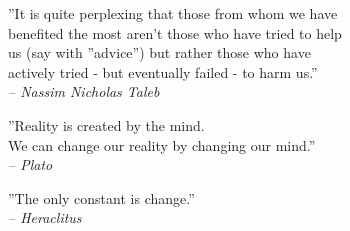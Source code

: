 \thispagestyle{plain}
\begin{flushright}
''It is quite perplexing that those from whom we have\\
benefited the most aren’t those who have tried to help\\
us (say with ''advice'') but rather those who have\\
actively tried - but eventually failed - to harm us.''\\

\textit{-- Nassim Nicholas Taleb}
\end{flushright}
%
%

\begin{flushright}
''Reality is created by the mind.\\
We can change our reality by changing our mind.''\\

\textit{-- Plato}
\end{flushright}
%
%

\begin{flushright}
''The only constant is change.''\\

\textit{-- Heraclitus}
\end{flushright}